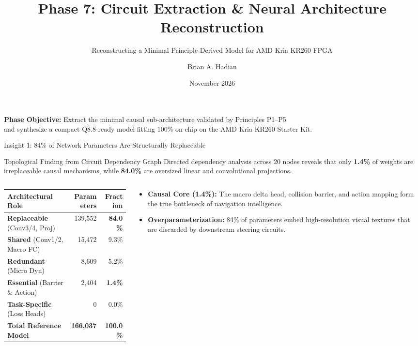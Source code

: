 \documentclass[aspectratio=169, 10pt]{beamer}
\title[Phase 7: Circuit Extraction]{Phase 7: Circuit Extraction \& Neural Architecture Reconstruction}
\subtitle{Reconstructing a Minimal Principle-Derived Model for AMD Kria KR260 FPGA}
\author[Brian A. Hadian]{Brian A. Hadian}
\institute[Advanced Agentic Systems]{Action-Conditioned World Models \& Language Navigation on AMD Kria KR260 FPGA}
\date{November 2026}
\begin{document}
\begin{frame}
  \titlepage
  \begin{center}
    \footnotesize
    \textbf{Phase Objective:} Extract the minimal causal sub-architecture validated by Principles P1--P5\\
    and synthesize a compact Q8.8-ready model fitting 100\% on-chip on the AMD Kria KR260 Starter Kit.
  \end{center}
\end{frame}

\begin{frame}{Insight 1: 84\% of Network Parameters Are Structurally Replaceable}
  \begin{block}{Topological Finding from Circuit Dependency Graph}
    Directed dependency analysis across 20 nodes reveals that only \textbf{1.4\%} of weights are irreplaceable causal mechanisms, while \textbf{84.0\%} are oversized linear and convolutional projections.
  \end{block}
  \vspace{-0.2cm}
  \begin{columns}[T]
    \begin{column}{0.50\textwidth}
      \setlength{\tabcolsep}{3pt}
      \begin{table}
        \centering
        \scriptsize
        \begin{tabular}{lrr}
          \toprule
          \textbf{Architectural Role} & \textbf{Parameters} & \textbf{Fraction} \\
          \midrule
          \textbf{Replaceable} (Conv3/4, Proj) & 139,552 & \textbf{84.0\%} \\
          \textbf{Shared} (Conv1/2, Macro FC) & 15,472 & 9.3\% \\
          \textbf{Redundant} (Micro Dyn) & 8,609 & 5.2\% \\
          \textbf{Essential} (Barrier \& Action) & 2,404 & \textbf{1.4\%} \\
          \textbf{Task-Specific} (Loss Heads) & 0 & 0.0\% \\
          \midrule
          \textbf{Total Reference Model} & \textbf{166,037} & \textbf{100.0\%} \\
          \bottomrule
        \end{tabular}
      \end{table}
    \end{column}
    \begin{column}{0.46\textwidth}
      \begin{itemize}
        \item \textbf{Causal Core (1.4\%):} The macro delta head, collision barrier, and action mapping form the true bottleneck of navigation intelligence.
        \item \textbf{Overparameterization:} 84\% of parameters embed high-resolution visual textures that are discarded by downstream steering circuits.
      \end{itemize}
    \end{column}
  \end{columns}
\end{frame}
\end{document}
